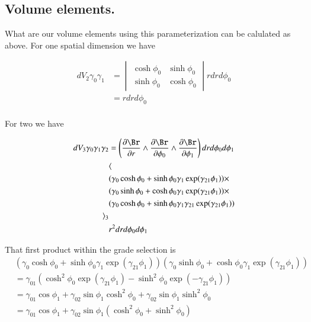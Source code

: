 \documentclass{article}
\begin{document}
\subsection{ Volume elements. }

What are our volume elements using this parameterization can be calulated as above.  For one spatial dimension we have

\begin{align*}
dV_2 \gamma_0 \gamma_1 
&=
\begin{vmatrix}
\cosh \phi_0 & \sinh\phi_0  \\
\sinh \phi_0 & \cosh\phi_0 
\end{vmatrix} r dr d\phi_0 \\
&=
r dr d\phi_0 \\
\end{align*}

For two we have

\begin{align*}
dV_3 \gamma_0 \gamma_1 \gamma_2
&= \left(\PD{r}{\Br} \wedge \PD{\phi_0}{\Br} \wedge \PD{\phi_1}{\Br} \right) dr d\phi_0 d\phi_1 \\
&\langle \\
& (\gamma_0 \cosh \phi_0 + \sinh\phi_0 \gamma_1 \exp( \gamma_{21} \phi_1 ) ) \times \\
& (\gamma_0 \sinh \phi_0 + \cosh\phi_0 \gamma_1 \exp( \gamma_{21} \phi_1 ) ) \times \\
& (\gamma_0 \cosh \phi_0 + \sinh\phi_0 \gamma_1 \gamma_{21} \exp( \gamma_{21} \phi_1 ) )  \\
\rangle_{3} \\
& r^2 dr d\phi_0 d\phi_1
\end{align*}

That first product within the grade selection is
\begin{align*}
&(\gamma_0 \cosh \phi_0 + \sinh\phi_0 \gamma_1 \exp( \gamma_{21} \phi_1 ) ) 
(\gamma_0 \sinh \phi_0 + \cosh\phi_0 \gamma_1 \exp( \gamma_{21} \phi_1 ) )  \\
&= \gamma_{01} ( \cosh^2\phi_0 \exp( \gamma_{21} \phi_1)  -\sinh^2\phi_0 \exp( -\gamma_{21} \phi_1 ) ) \\
&= \gamma_{01} \cos\phi_1
+\gamma_{02} \sin\phi_1 \cosh^2 \phi_0
+\gamma_{02} \sin\phi_1 \sinh^2 \phi_0 \\
&= \gamma_{01} \cos\phi_1 +\gamma_{02} \sin\phi_1 (\cosh^2 \phi_0 + \sinh^2 \phi_0) \\
\end{align*}
\end{document}
